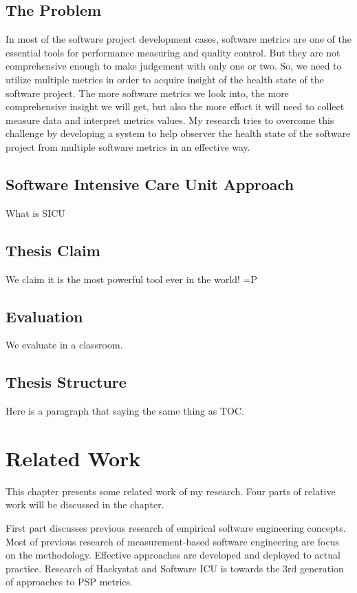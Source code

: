 \section{The Problem}
In most of the software project development cases, software metrics are one of the essential tools for performance measuring and quality control. But they are not comprehensive enough to make judgement with only one or two. So, we need to utilize multiple metrics in order to acquire insight of the health state of the software project. The more software metrics we look into, the more comprehensive insight we will get, but also the more effort it will need to collect measure data and interpret metrics values. My research tries to overcome this challenge by developing a system to help observer the health state of the software project from multiple software metrics in an effective way.

\section{Software Intensive Care Unit Approach}
What is SICU

\section{Thesis Claim}
We claim it is the most powerful tool ever in the world! =P

\section{Evaluation}
We evaluate in a classroom.

\section{Thesis Structure}
Here is a paragraph that saying the same thing as TOC.

\chapter{Related Work}
This chapter presents some related work of my research. Four parts of relative work will be discussed in the chapter.

First part discusses previous research of empirical software engineering concepts. Most of previous research of measurement-based software engineering are focus on the methodology. Effective approaches are developed and deployed to actual practice. Research of Hackystat and Software ICU is towards the 3rd generation of approaches to PSP metrics\cite{csdl2-02-07}.

